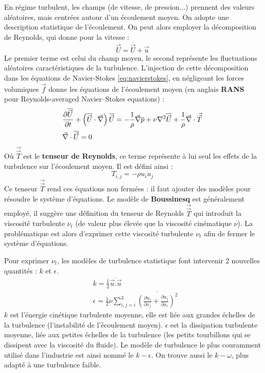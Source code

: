 En régime turbulent, les champs (de vitesse, de pression...) prennent des valeurs aléatoires, mais centrées autour d'un écoulement moyen. On adopte une description statistique de l'écoulement. On peut alors employer la décomposition de Reynolds, qui donne pour la vitesse :
%
\begin{equation}
    \vec{U} = \overline{\vec{U}} + \vec{u}
\end{equation}
%
Le premier terme est celui du champ moyen, le second représente les fluctuations aléatoires caractéristiques de la turbulence. L'injection de cette décomposition dans les équations de Navier-Stokes \eqref{eq:navierstokes}, en négligeant les forces volumiques $\vec{f}$ donne les équations de l'écoulement moyen (en anglais \textbf{RANS} pour Reynolds-averaged Navier–Stokes equations) :
%
\begin{align}[left=\empheqlbrace]
    & \frac{ \partial\overline{\vec{U}} }{ \partial t }
    + \left( \overline{\vec{U}} \cdot \vec{\nabla} \right) \overline{\vec{U}}
    = - \frac{1}{\rho} \vec{\nabla} \overline{p}
    + \nu  \nabla^2 \overline{\vec{U}}
    + \frac{1}{\rho} \vec{\nabla} \cdot \vec{\vec{T}} \\
    \notag & \vec{\nabla} \cdot \overline{\vec{U}} = 0
\end{align}
%
Où $\vec{\vec{T}}$ est le \textbf{tenseur de Reynolds}, ce terme représente à lui seul les effets de la turbulence sur l'écoulement moyen. Il est défini ainsi :
%
\begin{equation}
    T_{i,j} = - \rho \overline{u_i u_j}
\end{equation}
%
Ce tenseur $\vec{\vec{T}}$ rend ces équations non fermées : il faut ajouter des modèles pour résoudre le système d'équations. Le modèle de \textbf{Boussinesq} est généralement employé, il suggère une définition du tenseur de Reynolds $\vec{\vec{T}}$ qui introduit la viscosité turbulente $\nu_t$ (de valeur plus élevée que la viscosité cinématique $\nu$). La problématique est alors d'exprimer cette viscosité turbulente $\nu_t$ afin de fermer le système d'équations.

Pour exprimer $\nu_t$, les modèles de turbulence statistique font intervenir 2 nouvelles quantités : $k$ et $\epsilon$.
%
\begin{align}
    & k = \frac{1}{2} \overline{\vec{u}.\vec{u}} \\
    & \epsilon = \frac{1}{2} \nu \sum\limits_{i,j=i}^3 \overline{\left(
    \frac{ \partial u_i }{ \partial x_j }
    + \frac{ \partial u_j }{ \partial x_i } \right)^2}
\end{align}
%
$k$ est l'énergie cinétique turbulente moyenne, elle est liée aux grandes échelles de la turbulence (l'instabilité de l'écoulement moyen). $\epsilon$ est la dissipation turbulente moyenne, liée aux petites échelles de la turbulence (les petits tourbillons qui se dissipent avec la viscosité du fluide). Le modèle de turbulence le plus couramment utilisé dans l'industrie est ainsi nommé le $k - \epsilon$. On trouve aussi le $k - \omega$, plus adapté à une turbulence faible.

